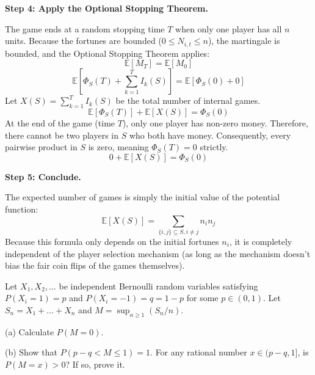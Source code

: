 \begin{solution}
\textbf{Step 4: Apply the Optional Stopping Theorem.}

The game ends at a random stopping time $T$ when only one player has all $n$ units.
Because the fortunes are bounded ($0 \leq N_{i,t} \leq n$), the martingale is bounded, and the Optional Stopping Theorem applies:
\[ \mathbb{E}[M_T] = \mathbb{E}[M_0] \]
\[ \mathbb{E}\left[ \Phi_S(T) + \sum_{k=1}^T I_k(S) \right] = \mathbb{E}[\Phi_S(0) + 0] \]
Let $X(S) = \sum_{k=1}^T I_k(S)$ be the total number of internal games.
\[ \mathbb{E}[\Phi_S(T)] + \mathbb{E}[X(S)] = \Phi_S(0) \]
At the end of the game (time $T$), only one player has non-zero money. Therefore, there cannot be two players in $S$ who both have money. Consequently, every pairwise product in $S$ is zero, meaning $\Phi_S(T) = 0$ strictly.
\[ 0 + \mathbb{E}[X(S)] = \Phi_S(0) \]

\textbf{Step 5: Conclude.}

The expected number of games is simply the initial value of the potential function:
\[ \mathbb{E}[X(S)] = \sum_{\{i,j\} \subseteq S, i \neq j} n_i n_j \]
Because this formula only depends on the initial fortunes $n_i$, it is completely independent of the player selection mechanism (as long as the mechanism doesn't bias the fair coin flips of the games themselves).
\end{solution}

\begin{exercise}\label{probability:2022:2}
Let $X_1, X_2, \ldots$ be independent Bernoulli random variables satisfying $P(X_i = 1) = p$ and $P(X_i = -1) = q = 1-p$ for some $p \in (0,1)$. Let $S_n = X_1 + \ldots + X_n$ and $M = \sup_{n \geq 1}(S_n/n)$.

(a) Calculate $P(M = 0)$.

(b) Show that $P(p - q < M \leq 1) = 1$. For any rational number $x \in (p-q, 1]$, is $P(M = x) > 0$? If so, prove it.
\end{exercise}

